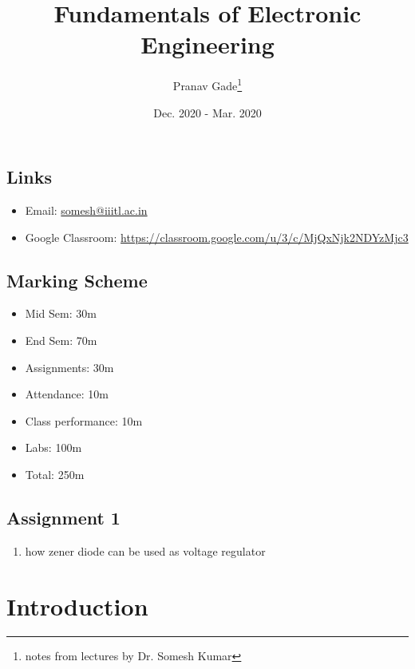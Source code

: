 \documentclass[10pt, a4paper]{report}
\author{Pranav Gade\thanks{notes from lectures by Dr. Somesh Kumar}}
\date{Dec. 2020 - Mar. 2020}
\title{Fundamentals of Electronic Engineering}
\begin{document}
	\maketitle
	\section*{Links}
	\begin{itemize}
		\item Email: \href{somesh@iiitl.ac.in}{somesh@iiitl.ac.in}
		\item Google Classroom: \href{https://classroom.google.com/u/3/c/MjQxNjk2NDYzMjc3}{https://classroom.google.com/u/3/c/MjQxNjk2NDYzMjc3}
	\end{itemize}
	\section*{Marking Scheme}
	\begin{itemize}
		\item Mid Sem: 30m
		\item End Sem: 70m
		\item Assignments: 30m
		\item Attendance: 10m
		\item Class performance: 10m
		\item Labs: 100m
		\item Total: 250m
	\end{itemize}
	\section*{Assignment 1}
	\begin{enumerate}
		\item how zener diode can be used as voltage regulator
	\end{enumerate}
	\newpage
	
	\chapter{Introduction}	
\end{document}
